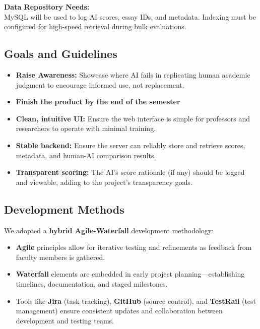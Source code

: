 \documentclass[12pt]{article}
\begin{document}
\vspace{1em}

\textbf{Data Repository Needs:}\\
MySQL will be used to log AI scores, essay IDs, and metadata. Indexing must be configured for high-speed retrieval during bulk evaluations.

\subsection{Goals and Guidelines}

\begin{itemize}
    \item \textbf{Raise Awareness:} Showcase where AI fails in replicating human academic judgment to encourage informed use, not replacement.

    \item \textbf{Finish the product by the end of the semester}

    \item \textbf{Clean, intuitive UI:} Ensure the web interface is simple for professors and researchers to operate with minimal training.

    \item \textbf{Stable backend:} Ensure the server can reliably store and retrieve scores, metadata, and human-AI comparison results.

    \item \textbf{Transparent scoring:} The AI’s score rationale (if any) should be logged and viewable, adding to the project's transparency goals.
\end{itemize}

\subsection{Development Methods}

We adopted a \textbf{hybrid Agile-Waterfall} development methodology:

\begin{itemize}
    \item \textbf{Agile} principles allow for iterative testing and refinements as feedback from faculty members is gathered.

    \item \textbf{Waterfall} elements are embedded in early project planning—establishing timelines, documentation, and staged milestones.

    \item Tools like \textbf{Jira} (task tracking), \textbf{GitHub} (source control), and \textbf{TestRail} (test management) ensure consistent updates and collaboration between development and testing teams.
\end{itemize}
\end{document}
